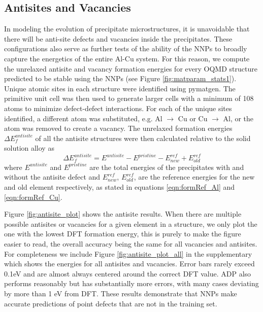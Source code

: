 \documentclass{article}
\begin{document}
\subsection{Antisites and Vacancies} \label{sct:antsite_results}

In modeling the evolution of precipitate microstructures, it is unavoidable that there will be anti-site defects and vacancies inside the precipitates.  These configurations also serve as further tests of the ability of the NNPs to broadly capture the energetics of the entire Al-Cu system.
For this reason, we compute the unrelaxed antisite and vacancy formation energies for every OQMD structure predicted to be stable using the NNPs (see Figure \ref{fig:matparam_stats1}). 
Unique atomic sites in each structure were identified using pymatgen.
The primitive unit cell was then used to generate larger cells with a minimum of 108 atoms to minimize defect-defect interactions.
For each of the unique sites identified, a different atom was substituted, e.g. Al $\rightarrow$ Cu or Cu $\rightarrow$ Al, or the atom was removed to create a vacancy.  The unrelaxed formation energies $\Delta E^{antisite}_f$ of all the antisite structures were then calculated relative to the solid solution alloy as
\begin{equation}
\Delta E^{antisite}_f = E^{antisite} - E^{pristine} - E^{ref}_{new} + E^{ref}_{old}
\end{equation}
where $E^{antisite}$ and $E^{pristine}$ are the total energies of the precipitates with and without the antisite defect and $E^{ref}_{new}$, $E^{ref}_{old}$,  are the reference energies for the new and old element respectively, as stated in 
equations \ref{eqn:formRef_Al} and \ref{eqn:formRef_Cu}.

Figure \ref{fig:antisite_plot} shows the antisite results.
When there are multiple possible antisites or vacancies for a given element in a structure, we only plot the one with the lowest DFT formation energy, this is purely to make the figure easier to read, the overall accuracy being the same for all vacancies and antisites. 
For completeness we include Figure \ref{fig:antisite_plot_all} in the supplementary which shows the energies for all antisites and vacancies.
Error bars rarely exceed 0.1eV and are almost always centered around the correct DFT value.
ADP also performs reasonably but has substantially more errors, with many cases deviating by more than 1 eV from DFT.
These results demonstrate that NNPs make accurate predictions of point defects that are not in the training set. 
\end{document}
